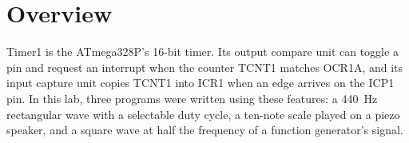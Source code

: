 \documentclass[11pt]{article}
\title{\labtitle \\[0.3em] \large \labdate}
\author{\studentname \\ \small \course{} \,}
\date{}
\begin{document}
\maketitle

\section{Overview}
Timer1 is the ATmega328P's 16-bit timer. Its output compare unit can toggle a pin and request an interrupt when the counter TCNT1 matches OCR1A, and its input capture unit copies TCNT1 into ICR1 when an edge arrives on the ICP1 pin. In this lab, three programs were written using these features: a 440~Hz rectangular wave with a selectable duty cycle, a ten-note scale played on a piezo speaker, and a square wave at half the frequency of a function generator's signal.
\end{document}
